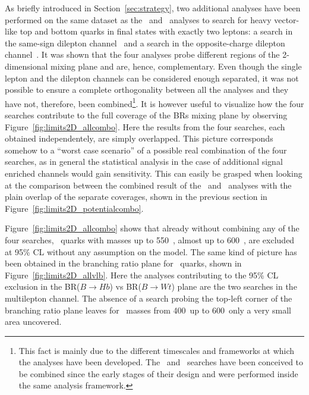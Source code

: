 As briefly introduced in Section~\ref{sec:strategy}, two
additional analyses have been performed on the same dataset
as the \wbx\ and \htx\ analyses to search for heavy vector-like
top and bottom quarks in final states with exactly two leptons:
a search in the same-sign 
dilepton channel~\cite{ATLAS-CONF-2013-051} and 
a search in the opposite-charge dilepton channel~\cite{ATLAS-CONF-2013-056}.
It was shown that the four analyses probe different 
regions of the 2-dimensional mixing plane and are,
hence, complementary. Even though the single lepton and
the dilepton channels can be considered enough
separated, it was not possible to ensure a complete
orthogonality between all the analyses and they have
not, therefore, been combined\footnote{This
fact is mainly due to the different timescales
and frameworks at which the analyses have been developed. 
The \wbx\ and \htx\ searches
have been conceived to be combined since the
early stages of their design and were performed
inside the same analysis framework.}.
It is however useful to visualize how
the four searches contribute to the full
coverage of the BRs mixing plane by
observing Figure~\ref{fig:limits2D_allcombo}.
Here the results from the four searches,
each obtained independentely, are simply
overlapped. This picture corresponds somehow to
a ``worst case scenario'' of a possible
real combination of the four searches, as
in general the statistical analysis in the
case of additional signal enriched
channels would gain sensitivity. 
This can easily be grasped when looking
at the comparison between the combined result
of the \wbx\ and \htx\ analyses
with the plain overlap of the separate
coverages, shown in the previous section 
in Figure~\ref{fig:limits2D_potentialcombo}.

Figure~\ref{fig:limits2D_allcombo} shows that already
without combining any of the four searches,
\T\ quarks with masses up to 550~\gev, almost up
to 600~\gev, are excluded at 95\% CL without 
any assumption on the model. The same kind of
picture has been obtained in the branching ratio plane for
\B\ quarks, shown in Figure~\ref{fig:limits2D_allvlb}.
Here the analyses contributing to the
95\% CL exclusion in the BR($B\to Hb$) vs  BR($B\to Wt$)
plane are the two searches in the multilepton channel.
The absence of a search probing the top-left corner
of the branching ratio plane leaves for \B\ masses from 400~\gev up to
600~\gev only a very small area uncovered.


